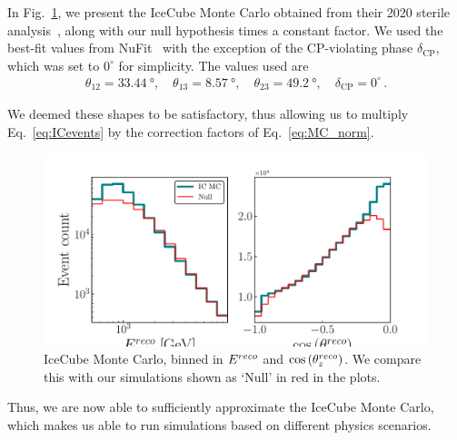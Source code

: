In Fig.~\ref{fig:IC_MC_norm}, we present the IceCube Monte Carlo obtained from their 2020 sterile analysis~\cite{IC2020}, along
with our null hypothesis times a constant factor. 
We used the best-fit values from NuFit~\cite{nufit} with the exception of the CP-violating phase $\delta_\text{CP}$, which was set to $0^\circ$ for simplicity. The values used are
\begin{align}\label{eq:nufitparams}
    \theta_{12} = \SI{33.44}{\degree},\hspace{1em} \theta_{13} = \SI{8.57}{\degree},\hspace{1em} \theta_{23} = \SI{49.2}{\degree}, \hspace{1em} \delta_\text{CP} = 0^\circ\,.
\end{align}

We deemed these shapes to be satisfactory, thus allowing us to multiply Eq.~\ref{eq:ICevents} by the 
correction factors of Eq.~\ref{eq:MC_norm}.
\begin{figure}[ht]
    \begin{centering}
    \includegraphics[scale=0.7]{figures/IC_MC_norm.pdf}
    \caption{IceCube Monte Carlo, binned in $E^{reco}$ and $\cos{(\theta_z^{reco})}$. We compare this with our simulations shown as `Null' in red in the plots.}\label{fig:IC_MC_norm}
    \end{centering}
\end{figure} 
Thus, we are now able to sufficiently approximate the IceCube Monte Carlo, which makes us able to run simulations based on different physics scenarios.
